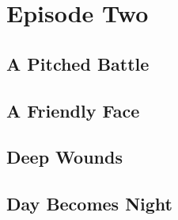 \documentclass[././main.tex]{subfiles}
\begin{document}
\section{Episode Two}
\subsection{A Pitched Battle}
\subsection{A Friendly Face}
\subsection{Deep Wounds}
\subsection{Day Becomes Night}
\end{document}
